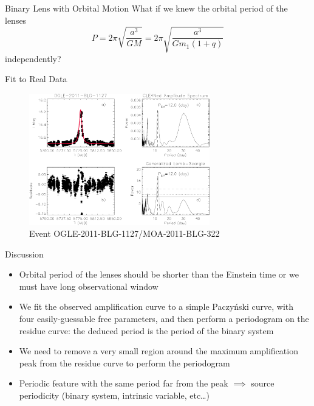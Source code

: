\documentclass[final,hyperref={pdfpagelabels=false}]{beamer}
\newcommand{\pro}{\color{alerted text.fg}{\ding{51}}}
\newcommand{\con}{\color{alerted text.fg}{\ding{55}}}
\begin{document}
\begin{frame}
\begin{columns}
\begin{column}{0.48\columnwidth}
\begin{minipage}[T]{\columnwidth}
\begin{block}{Binary Lens with Orbital Motion}
          What if we knew the orbital period of the lenses
          \begin{equation*}
            P = 2\pi\sqrt{\frac{a^{3}}{GM}} =
            2\pi\sqrt{\frac{a^{3}}{Gm_{1}(1 + q)}}
          \end{equation*}
          \alert{independently}?
        \end{block}

        \begin{block}{Fit to Real Data}
          \begin{figure}
            \centering
            \includegraphics[width=0.7\textwidth]{figures/ogle322all}
            \caption{Event OGLE-2011-BLG-1127/MOA-2011-BLG-322}
            \vspace{-0.5em}
          \end{figure}
        \end{block}

        \begin{block}{Discussion}
          \begin{itemize}
          \item[\pro] Orbital period of the lenses should be \alert{shorter}
            than the Einstein time or we must have \alert{long observational
              window}
          \item[\pro] We fit the observed amplification curve to a \alert{simple
              Paczyński curve}, with four easily-guessable free parameters, and
            then perform a periodogram on the residue curve: the deduced period
            is the \alert{period of the binary system}
          \item[\pro] We need to \alert{remove a very small region} around the
            maximum amplification peak from the residue curve to perform the
            periodogram
          \item[\con] Periodic feature with the same period far from the peak
            \(\implies\) \alert{source periodicity} (binary system, intrinsic
            variable, etc\dots)
          \end{itemize}
        \end{block}
      \end{minipage}
    \end{column}


\end{columns}
\end{frame}
\end{document}
